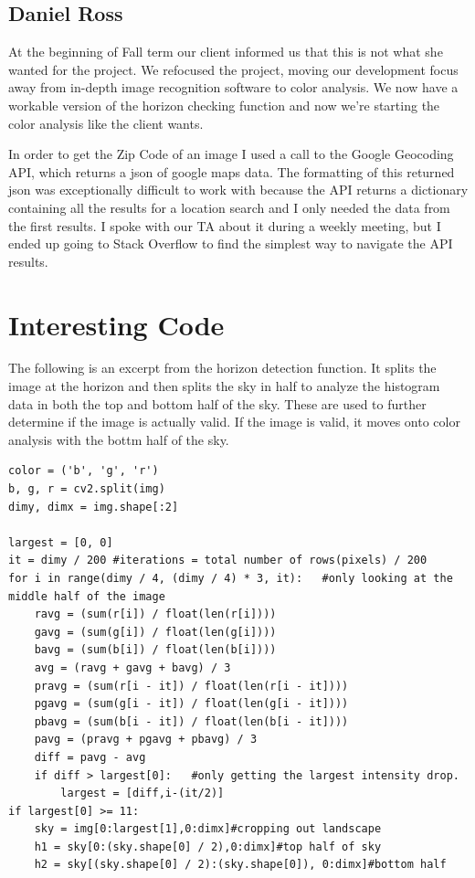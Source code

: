 \documentclass[onecolumn, draftclsnofoot,10pt, compsoc]{IEEEtran}
\begin{document}
\begin{singlespace}
		\subsection{Daniel Ross}
			At the beginning of Fall term our client informed us that this is not what she wanted for the project.
			We refocused the project, moving our development focus away from in-depth image recognition software to color analysis.
			We now have a workable version of the horizon checking function and now we're starting the color analysis like the client wants.

			In order to get the Zip Code of an image I used a call to the Google Geocoding API, which returns a json of google maps data.
			The formatting of this returned json was exceptionally difficult to work with because the API returns a dictionary containing all the results for a location search and I only needed the data from the first results.
			I spoke with our TA about it during a weekly meeting, but I ended up going to Stack Overflow to find the simplest way to navigate the API results.
		
	\section{Interesting Code}
		The following is an excerpt from the horizon detection function. It splits the image at the horizon and then splits the sky in half to analyze the histogram data in both the top and bottom half of the sky.
		These are used to further determine if the image is actually valid.
		If the image is valid, it moves onto color analysis with the bottm half of the sky.
		\begin{lstlisting}
color = ('b', 'g', 'r')
b, g, r = cv2.split(img)
dimy, dimx = img.shape[:2]

largest = [0, 0]
it = dimy / 200 #iterations = total number of rows(pixels) / 200
for i in range(dimy / 4, (dimy / 4) * 3, it):   #only looking at the middle half of the image
	ravg = (sum(r[i]) / float(len(r[i])))
	gavg = (sum(g[i]) / float(len(g[i])))
	bavg = (sum(b[i]) / float(len(b[i])))
	avg = (ravg + gavg + bavg) / 3
	pravg = (sum(r[i - it]) / float(len(r[i - it])))
	pgavg = (sum(g[i - it]) / float(len(g[i - it])))
	pbavg = (sum(b[i - it]) / float(len(b[i - it])))
	pavg = (pravg + pgavg + pbavg) / 3
	diff = pavg - avg
	if diff > largest[0]:   #only getting the largest intensity drop.
		largest = [diff,i-(it/2)]
if largest[0] >= 11:
	sky = img[0:largest[1],0:dimx]#cropping out landscape
	h1 = sky[0:(sky.shape[0] / 2),0:dimx]#top half of sky
	h2 = sky[(sky.shape[0] / 2):(sky.shape[0]), 0:dimx]#bottom half


\end{lstlisting}
\end{singlespace}
\end{document}
